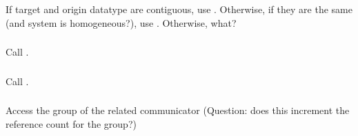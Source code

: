 \documentclass{article}
\begin{document}
\subsubsection{}

\subsubsection{}
\begin{adi3}
\begin{mmadi}If target and origin datatype are contiguous, use
  .  Otherwise, if they are the same (and system is
  homogeneous?), use .  
  Otherwise, what?
\end{mmadi}
\end{adi3}

\subsubsection{}

\subsubsection{}

\subsubsection{}
Call .

\subsubsection{}
Call .

\subsubsection{}

\subsubsection{}

\subsubsection{}
Access the group of the related communicator (Question: does this increment the
reference count for the group?)
\end{document}

